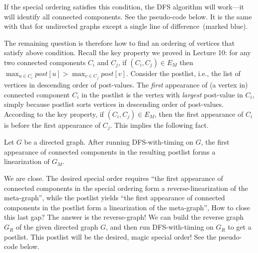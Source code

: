 If the special ordering satisfies this condition, the DFS algorithm will
work---it will identify all connected components. See the pseudo-code below. 
It is the same with that for undirected graphs 
except a single line of difference~(marked blue).

\begin{algorithmblock}[0.8\textwidth]
	\xxx
	\xxx
	\xxx
	\xxx
	\xxx
	\xxx
\end{algorithmblock}

\begin{algorithmblock}[0.8\textwidth]
	\xxx
	\xxx
	\xxx
	\xxx
\end{algorithmblock}


The remaining question is therefore how to find an ordering of vertices that satisfy above condition.
Recall the key property we proved in Lecture 10: for any two connected components $C_i$ and $C_j$, if $(C_i, C_j) \in E_M$ then
$\max_{u\in C_i} post[u] > \max_{v\in C_j} post[v]$.
Consider the postlist, i.e., the list of vertices in descending order of post-values.
The \emph{first} appearance of (a vertex in) connected component $C_i$ in the postlist
is the vertex with \emph{largest} post-value in $C_i$, simply because postlist sorts vertices in descending order of post-values.
According to the key property, if $(C_i, C_j)\in E_M$, then the first appearance of $C_i$ is before the first appearance of $C_j$.
This implies the following fact.
\begin{claim}
Let $G$ be a directed graph. After running DFS-with-timing on $G$,
the first appearance of connected components in the resulting postlist forms a linearization of $G_M$.
\end{claim}

We are close. The desired special order requires 
``the first appearance of connected components in the special ordering form a reverse-linearization of the meta-graph'',
while the postlist yields 
``the first appearance of connected components in the postlist form a linearization of the meta-graph'',
How to close this last gap? The answer is the reverse-graph!
We can build the reverse graph $G_R$ of the given directed graph $G$,
and then run DFS-with-timing on $G_R$ to get a postlist.
This postlist will be the desired, magic special order!
See the pseudo-code below.

